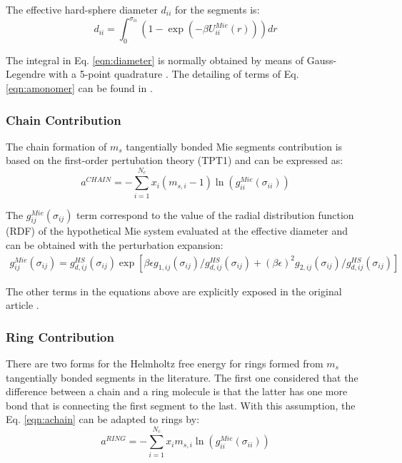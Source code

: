 The effective hard-sphere diameter $d_{ii}$ for the segments is:
\begin{equation}
d_{ii} =\int_{0}^{\sigma_{ii}} ( 1 - \exp(-\beta U^{Mie}_{ii}(r)) ) dr
\label{eqn:diameter}
\end{equation}


The integral in Eq. \eqref{eqn:diameter} is normally obtained by means of Gauss-Legendre with a 5-point quadrature \cite{papa2014}. The detailing of terms of Eq. \eqref{eqn:amonomer} can be found in .

\subsubsection{Chain Contribution}
The chain formation of $m_{s}$ tangentially bonded Mie segments contribution is based on the first-order pertubation theory (TPT1)  \cite{papa2014} and can be expressed as:
\begin{equation}
a^{CHAIN} =-\sum_{i=1}^{N_{c}} x_{i}(m_{s,i} - 1)\ln(g_{ii}^{Mie}(\sigma_{ii}))
\label{eqn:achain}
\end{equation}


The $g_{ij}^{Mie}(\sigma_{ij})$ term correspond to the value of the radial distribution function (RDF) of the hypothetical Mie system evaluated at the effective diameter and can be obtained with the perturbation expansion:
\begin{equation}
\begin{aligned}
g_{ij}^{Mie}(\sigma_{ij}) =g_{d,ij}^{HS}(\sigma_{ij})\exp[\beta\epsilon g_{1,ij}(\sigma_{ij})/g_{d,ij}^{HS}(\sigma_{ij}) + (\beta\epsilon)^{2} g_{2,ij}(\sigma_{ij})/g_{d,ij}^{HS}(\sigma_{ij})]
\end{aligned}
\label{eqn:gmie}
\end{equation}


The other terms in the equations above are explicitly exposed in the original article \cite{lafitte2013}. 

\subsubsection{Ring Contribution}
There are two forms for the Helmholtz free energy for rings formed from $m_{s}$ tangentially bonded segments in the literature. The first one  \cite{lafitte2012} considered that the difference between a chain and a ring molecule is that the latter has one more bond that is connecting the first segment to the last. With this assumption, the Eq. \eqref{eqn:achain} can be adapted to rings by:
\begin{equation}
a^{RING} =-\sum_{i=1}^{N_{c}} x_{i}m_{s,i}\ln(g_{ii}^{Mie}(\sigma_{ii}))
\label{eqn:aringlafitte}
\end{equation}

